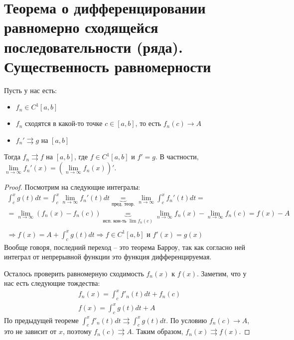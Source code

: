 \section{Теорема о дифференцировании равномерно сходящейся последовательности (ряда). Существенность равномерности}
\begin{theorem} Пусть у нас есть:
    \begin{itemize}
       \item $f_n \in C^1[a, b]$
       \item $f_n$ сходятся в какой-то точке $c \in [a, b]$, то есть $f_n(c) \to A$
       \item $f_n' \rightrightarrows g$ на $[a, b]$
   \end{itemize}
   Тогда $f_n \rightrightarrows f$ на $[a, b]$, где $f \in C^1[a, b]$ и $f' = g$. В частности, $\lim\limits_{n \to \infty} f_n'(x) = (\lim\limits_{n \to \infty} f_n(x))'$.
\end{theorem}
\begin{proof}
   Посмотрим на следующие интегралы:
   \begin{gather*}
       \int_c^x g(t)dt = \int_c^x \lim\limits_{n \to \infty} f_n'(t)dt \underbrace{=}_{\text{пред. теор.}} \lim\limits_{n \to \infty} \int_c^x  f_n'(t)dt = \\
       = \lim\limits_{n \to \infty} (f_n(x) - f_n(c)) \underbrace{=}_{\text{исп. кон-ть $\lim f_n(c)$}} \lim\limits_{n \to \infty} f_n(x) - \lim\limits_{n \to \infty} f_n(c) = f(x) - A \\ 
       \\
       \Rightarrow f(x) = A + \int_c^x g(t)dt \Rightarrow f \in C^1[a, b] \text{ и } f'(x) = g(x)
   \end{gather*}
   \quad Вообще говоря, последний переход -- это теорема Барроу, так как согласно ней интеграл от непрерывной функции это функция дифференцируемая.

   \quad Осталось проверить равномерную сходимость $f_n(x)$ к $f(x)$.
   Заметим, что у нас есть следующие тождества:
   \begin{gather*}
       f_n(x) = \int_c^x f'_n(t)dt + f_n(c) \\
       f(x) = \int_c^x g(t)dt + A
   \end{gather*}
   По предыдущей теореме $\int_c^x f'_n(t)dt \rightrightarrows \int_c^x g(t)dt$. 
   По условию $f_n(c) \to A$, это не зависит от $x$, поэтому $f_n(c) \rightrightarrows A$.
   Таким образом, $f_n(x) \rightrightarrows f(x)$.
\end{proof}

